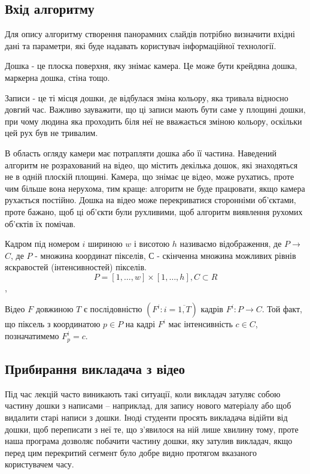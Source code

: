 \subsection{Вхід алгоритму}

Для опису алгоритму створення панорамних слайдів потрібно визначити 
вхідні дані та параметри, які буде надавать користувач інформаційної
технології.

Дошка - це плоска поверхня, яку знімає камера. Це може бути крейдяна 
дошка, маркерна дошка, стіна тощо.

Записи - це ті місця дошки, де відбулася зміна кольору, яка тривала 
відносно довгий час. Важливо зауважити, що ці записи мають бути 
саме у площині дошки, при чому людина яка проходить біля неї не вважається
зміною кольору, оскільки цей рух був не тривалим.

В область огляду камери має потрапляти дошка або її частина. Наведений 
алгоритм не розрахований на відео, що містить декілька дошок, які знаходяться
не в одній плоскій площині. Камера, що знімає це відео, може рухатись, проте 
чим більше вона нерухома, тим краще: алгоритм не буде працювати, якщо камера 
рухається постійно. Дошка на відео може перекриватися сторонніми об’єктами, 
проте бажано, щоб ці об’єкти були рухливими, щоб алгоритм виявлення рухомих 
об’єктів їх помічав.

Кадром під номером $i$ шириною $w$ і висотою $h$ називаємо відображення, де 
$P$$\to$$C$, де $P$ - множина координат пікселів, $С$ - скінченна множина можливих рівнів
яскравостей (інтенсивностей) пікселів.
\begin{equation}
    P = [1, \ldots ,w]\times[1, \ldots, h], C \subset R
\end{equation},

Відео \(F\) довжиною \(T\)
є послідовністю \(\left( F^{i}:i = \overline{1,T} \right)\) кадрів
\(F^{i}:P \rightarrow C\). Той факт, що піксель з координатою
\(p \in P\) на кадрі \(F^{i}\) має інтенсивність \(c \in C\),
позначатимемо \(F_{p}^{i} = c\).


\subsection{Прибирання викладача з відео}

Під час лекцій часто виникають такі ситуації, коли викладач затуляє
собою частину дошки з написами -- наприклад, для запису нового матеріалу
або щоб видалити старі написи з дошки. Іноді студенти просять викладача
відійти від дошки, щоб переписати з неї те, що з'явилося на ній лише
хвилину тому, проте наша програма дозволяє побачити частину дошки, яку
затулив викладач, якщо перед цим перекритий сегмент було добре видно
протягом вказаного користувачем часу.


